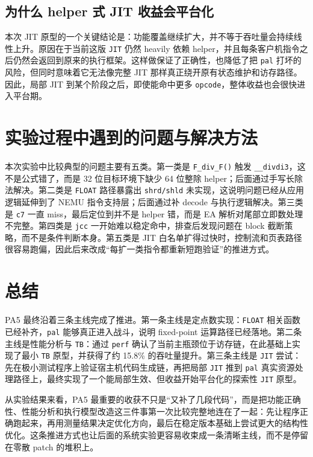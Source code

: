 \documentclass[a4paper]{article}
\begin{document}
\subsection{为什么 helper 式 JIT 收益会平台化}
本次 JIT 原型的一个关键结论是：功能覆盖继续扩大，并不等于吞吐量会持续线性上升。原因在于当前这版 \texttt{JIT} 仍然 heavily 依赖 helper，并且每条客户机指令之后仍然会返回到原来的执行框架。这样做保证了正确性，也降低了把 \texttt{pal} 打坏的风险，但同时意味着它无法像完整 JIT 那样真正绕开原有状态维护和访存路径。因此，局部 JIT 到某个阶段之后，即使能命中更多 \texttt{opcode}，整体收益也会很快进入平台期。

\section{实验过程中遇到的问题与解决方法}
本次实验中比较典型的问题主要有五类。第一类是 \texttt{F\_div\_F()} 触发 \texttt{\_\_divdi3}，这不是公式错了，而是 32 位目标环境下缺少 64 位整除 helper；后面通过手写长除法解决。第二类是 \texttt{FLOAT} 路径暴露出 \texttt{shrd/shld} 未实现，这说明问题已经从应用逻辑延伸到了 NEMU 指令支持层；后面通过补 decode 与执行逻辑解决。第三类是 \texttt{c7} 一直 miss，最后定位到并不是 helper 错，而是 EA 解析对尾部立即数处理不完整。第四类是 \texttt{jcc} 一开始难以稳定命中，排查后发现问题在 block 截断策略，而不是条件判断本身。第五类是 JIT 白名单扩得过快时，控制流和页表路径很容易跑偏，因此后来改成“每扩一类指令都重新短跑验证”的推进方式。

\section{总结}
PA5 最终沿着三条主线完成了推进。第一条主线是定点数实现：\texttt{FLOAT} 相关函数已经补齐，\texttt{pal} 能够真正进入战斗，说明 fixed-point 运算路径已经落地。第二条主线是性能分析与 \texttt{TB}：通过 \texttt{perf} 确认了当前主瓶颈位于访存链，在此基础上实现了最小 \texttt{TB} 原型，并获得了约 15.8\% 的吞吐量提升。第三条主线是 \texttt{JIT} 尝试：先在极小测试程序上验证宿主机代码生成链，再把局部 \texttt{JIT} 推到 \texttt{pal} 真实资源处理路径上，最终实现了一个能局部生效、但收益开始平台化的探索性 \texttt{JIT} 原型。

从实验结果来看，PA5 最重要的收获不只是“又补了几段代码”，而是把功能正确性、性能分析和执行模型改造这三件事第一次比较完整地连在了一起：先让程序正确跑起来，再用测量结果决定优化方向，最后在稳定版本基础上尝试更大的结构性优化。这条推进方式也让后面的系统实验更容易收束成一条清晰主线，而不是停留在零散 patch 的堆积上。
\end{document}
